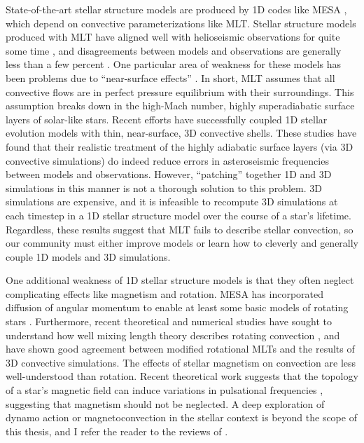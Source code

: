 State-of-the-art stellar structure models are produced by 1D codes like MESA \citep{paxton&all2011}, which depend on convective parameterizations like MLT.
Stellar structure models produced with MLT have aligned well with helioseismic observations for quite some time \citep{christensen-dalsgaard&all1996}, and disagreements between models and observations are generally less than a few percent \citep{serenelli&all2009}.
One particular area of weakness for these models has been problems due to ``near-surface effects'' \citep{kjeldsen&all2008}.
In short, MLT assumes that all convective flows are in perfect pressure equilibrium with their surroundings.
This assumption breaks down in the high-Mach number, highly superadiabatic surface layers of solar-like stars.
Recent efforts \citep{jorgensen&weiss2019, mosumgaard&all2020} have successfully coupled 1D stellar evolution models with thin, near-surface, 3D convective shells.
These studies have found that their realistic treatment of the highly adiabatic surface layers (via 3D convective simulations) do indeed reduce errors in asteroseismic frequencies between models and observations.
However, ``patching'' together 1D and 3D simulations in this manner is not a thorough solution to this problem.
3D simulations are expensive, and it is infeasible to recompute 3D simulations at each timestep in a 1D stellar structure model over the course of a star's lifetime.
Regardless, these results suggest that MLT fails to describe stellar convection, so our community must either improve models or learn how to cleverly and generally couple 1D models and 3D simulations.

One additional weakness of 1D stellar structure models is that they often neglect complicating effects like magnetism and rotation.
MESA has incorporated diffusion of angular momentum to enable at least some basic models of rotating stars \citep{paxton&all2013}.
Furthermore, recent theoretical and numerical studies have sought to understand how well mixing length theory describes rotating convection \citep{BDLithwick2014, currie&all2020}, and have shown good agreement between modified rotational MLTs and the results of 3D convective simulations.
The effects of stellar magnetism on convection are less well-understood than rotation.
Recent theoretical work suggests that the topology of a star's magnetic field can induce variations in pulsational frequencies \citep{santos&all2018}, suggesting that magnetism should not be neglected.
A deep exploration of dynamo action or magnetoconvection in the stellar context is beyond the scope of this thesis, and I refer the reader to the reviews of \citet{brandenburg&subramian2005, charbonneau2010, charbonneau2014, brun&browning2017}.


